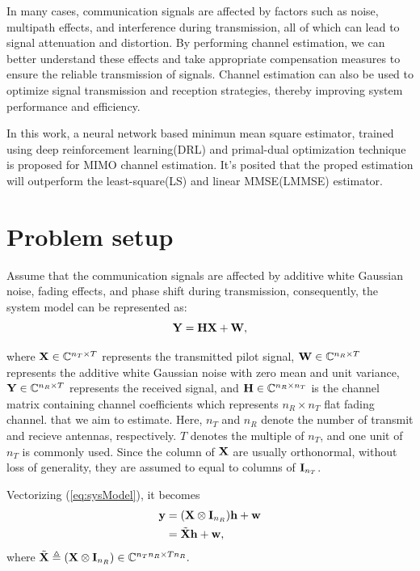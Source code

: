 \documentclass[journal,10pt,twocolumn]{IEEEtran}
\begin{document}
        In many cases, communication signals are affected by factors such as noise, multipath effects, and interference during transmission, all of which can lead to 
        signal attenuation and distortion. By performing channel estimation, we can better understand these effects and take appropriate compensation measures to ensure 
        the reliable transmission of signals. Channel estimation can also be used to optimize signal transmission and reception strategies, thereby improving system 
        performance and efficiency. 

        In this work, a neural network based minimun mean square estimator, trained using deep reinforcement learning(DRL) and primal-dual optimization technique
        is proposed for MIMO channel estimation. It's posited that the proped estimation will outperform the least-square(LS) and linear MMSE(LMMSE) estimator.

    \section{Problem setup}
    
        Assume that the communication signals are affected by additive white Gaussian noise, fading effects, and phase shift during transmission, consequently,
        the system model can be represented as:
        \begin{equation} \label{eq:sysModel}
            {\bf Y} = {\bf H}{\bf X} + {\bf W},
        \end{equation}

        where ${\bf X} \in \mathbb{C}^{n_T \times T}$ represents the transmitted pilot signal, ${\bf W} \in \mathbb{C}^{n_R \times T}$ represents the additive white Gaussian noise
        with zero mean and unit variance, ${\bf Y} \in \mathbb{C}^{n_R \times T}$ represents the received signal, and ${\bf H} \in \mathbb{C}^{n_R \times n_T}$ 
        is the channel matrix containing channel coefficients which represents $n_R \times n_T$ flat fading channel.
        that we aim to estimate. Here, $n_T$ and $n_R$ denote the number of transmit and recieve antennas, respectively. $T$ denotes the multiple of $n_T$, 
        and one unit of $n_T$ is commonly used. Since the column of ${\bf X}$ are usually orthonormal, without loss of generality, they are assumed to equal to columns 
        of ${\bf I}_{n_T}$.

        Vectorizing (\ref{eq:sysModel}), it becomes 
        \begin{align} \label{vecSysModel}
            {\bf y} &= ({\bf X} \otimes {\bf I}_{n_R}){\bf h} + {\bf w} \notag \\ &= \tilde{{\bf X}}{\bf h} + {\bf w},
        \end{align}
        where $\tilde{{\bf X}} \triangleq ({\bf X} \otimes {\bf I}_{n_R}) \in \mathbb{C}^{n_T n_R \times T n_R}.$
\end{document}
